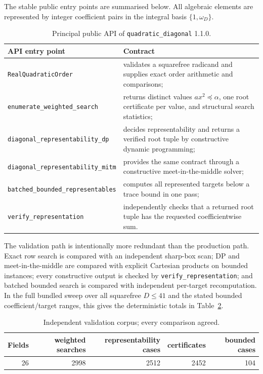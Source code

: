 \documentclass[manuscript]{acmart}
\theoremstyle{plain}
\theoremstyle{definition}
\theoremstyle{nonitalicremark}
\begin{document}
The stable public entry points are summarised below. All algebraic elements are represented by
integer coefficient pairs in the integral basis $\{1,\omega_D\}$.
\begin{table}[tbp]
\centering
\small
\begin{tabularx}{\textwidth}{l X}
\toprule
API entry point & Contract \\
\midrule
\texttt{RealQuadraticOrder} & validates a squarefree radicand and supplies exact order arithmetic and comparisons; \\
\texttt{enumerate\_weighted\_search} & returns distinct values $ax^2\preccurlyeq\alpha$, one root certificate per value, and structural search statistics; \\
\texttt{diagonal\_representability\_dp} & decides representability and returns a verified root tuple by constructive dynamic programming; \\
\texttt{diagonal\_representability\_mitm} & provides the same contract through a constructive meet-in-the-middle solver; \\
\texttt{batched\_bounded\_representables} & computes all represented targets below a trace bound in one pass; \\
\texttt{verify\_representation} & independently checks that a returned root tuple has the requested coefficientwise sum. \\
\bottomrule
\end{tabularx}
\caption{Principal public API of \texttt{quadratic\_diagonal} 1.1.0.}
\label{tab:api}
\end{table}

The validation path is intentionally more redundant than the production path. Exact row search is
compared with an independent sharp-box scan; DP and meet-in-the-middle are compared with explicit
Cartesian products on bounded instances; every constructive output is checked by
\texttt{verify\_representation}; and batched bounded search is compared with independent per-target
recomputation. In the full bundled sweep over all squarefree $D\le 41$ and the stated bounded
coefficient/target ranges, this gives the deterministic totals in Table~\ref{tab:validation-summary}.
\begin{table}[tbp]
\centering
\small
\begin{tabular}{rrrrr}
\toprule
Fields & weighted searches & representability cases & certificates & bounded cases \\
\midrule
26 & 2998 & 2512 & 2452 & 104 \\
\bottomrule
\end{tabular}
\caption{Independent validation corpus; every comparison agreed.}
\label{tab:validation-summary}
\end{table}
\end{document}

